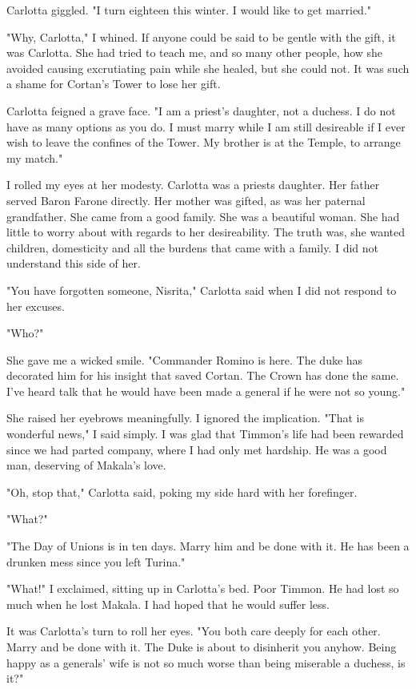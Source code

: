 \documentclass{article}
\begin{document}
Carlotta giggled. "I turn eighteen this winter. I would like to get married."

"Why, Carlotta," I whined. If anyone could be said to be gentle with the gift, it was Carlotta. She had tried to teach me, and so many other people, how she avoided causing excrutiating pain while she healed, but she could not. It was such a shame for Cortan's Tower to lose her gift. 

Carlotta feigned a grave face. "I am a priest's daughter, not a duchess. I do not have as many options as you do. I must marry while I am still desireable if I ever wish to leave the confines of the Tower. My brother is at the Temple, to arrange my match."

I rolled my eyes at her modesty. Carlotta was a priests daughter. Her father served Baron Farone directly. Her mother was gifted, as was her paternal grandfather. She came from a good family. She was a beautiful woman. She had little to worry about with regards to her desireability. The truth was, she wanted children, domesticity and all the burdens that came with a family. I did not understand this side of her. 

"You have forgotten someone, Nisrita," Carlotta said when I did not respond to her excuses.

"Who?"

She gave me a wicked smile. "Commander Romino is here. The duke has decorated him for his insight that saved Cortan. The Crown has done the same. I've heard talk that he would have been made a general if he were not so young." 

She raised her eyebrows meaningfully. I ignored the implication. "That is wonderful news," I said simply. I was glad that Timmon's life had been rewarded since we had parted company, where I had only met hardship. He was a good man, deserving of Makala's love. 

"Oh, stop that," Carlotta said, poking my side hard with her forefinger. 

"What?"

"The Day of Unions is in ten days. Marry him and be done with it. He has been a drunken mess since you left Turina."

"What!" I exclaimed, sitting up in Carlotta's bed. Poor Timmon. He had lost so much when he lost Makala. I had hoped that he would suffer less.

It was Carlotta's turn to roll her eyes. "You both care deeply for each other. Marry and be done with it. The Duke is about to disinherit you anyhow. Being happy as a generals' wife is not so much worse than being miserable a duchess, is it?"
\end{document}
